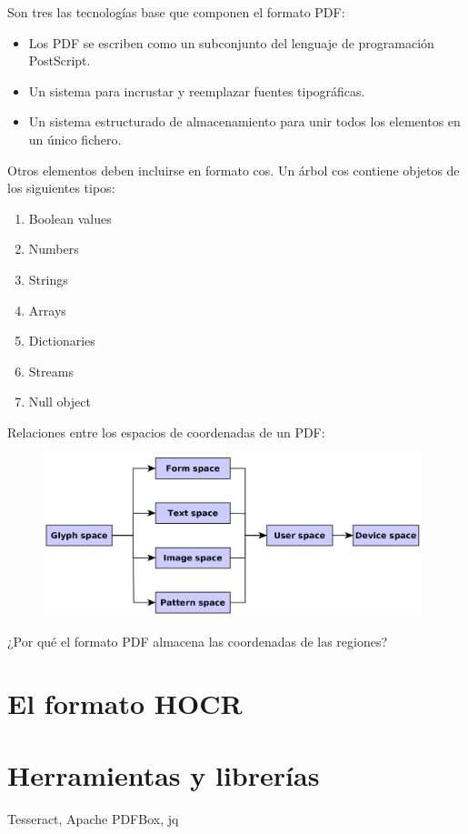 Son tres las tecnologías base que componen el formato PDF:

\begin{itemize}
    \item Los PDF se escriben como un subconjunto del lenguaje de programación PostScript.
    \item Un sistema para incrustar y reemplazar fuentes tipográficas.
    \item Un sistema estructurado de almacenamiento para unir todos los elementos en un único fichero.
\end{itemize}

Otros elementos deben incluirse en formato \acrfull{cos}. Un árbol cos contiene objetos de los siguientes tipos:

\begin{enumerate}
    \item Boolean values
    \item Numbers
    \item Strings
    \item Arrays
    \item Dictionaries
    \item Streams
    \item Null object
\end{enumerate}

Relaciones entre los espacios de coordenadas de un PDF:

\begin{figure}[hp!]
  \centering
  \includegraphics[width=11cm]{imaxes/espacios-coordenadas.png}
\end{figure}

¿Por qué el formato PDF almacena las coordenadas de las regiones?

\section{El formato HOCR}
\section{Herramientas y librerías}
Tesseract, Apache PDFBox, jq

